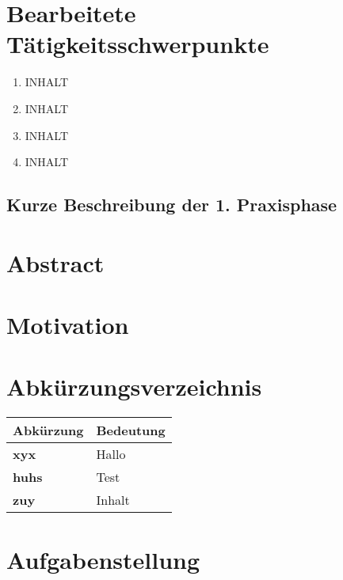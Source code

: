 \documentclass[12px, a4paper]{article}
\begin{document}
\newpage
\thispagestyle{empty}
\section*{Bearbeitete Tätigkeitsschwerpunkte }
\begin{enumerate}
	\item INHALT
	\item INHALT
	\item INHALT
	\item INHALT
\end{enumerate}
\begin{spacing}{1.5}
\subsection*{Kurze Beschreibung der 1. Praxisphase}
\Blindtext
 \newpage
\section*{Abstract}
\blindtext

\section*{Motivation}

\Blindtext

\newpage


\newpage
\tableofcontents
\newpage


\newpage
\section*{Abkürzungsverzeichnis}
\begin{tabular}[h]{l | l}
	\hline
	\textbf{Abkürzung} & \textbf{Bedeutung} \\
	\hline
		\textbf{xyx} 	& Hallo \\
		\textbf{huhs} 	& Test \\
		\textbf{zuy}	& Inhalt \\
		
		
\end{tabular}
\newpage

\setlength{\columnsep}{2.5cm}

\setcounter{page}{1}

\section{Aufgabenstellung}

\end{spacing}
\end{document}

